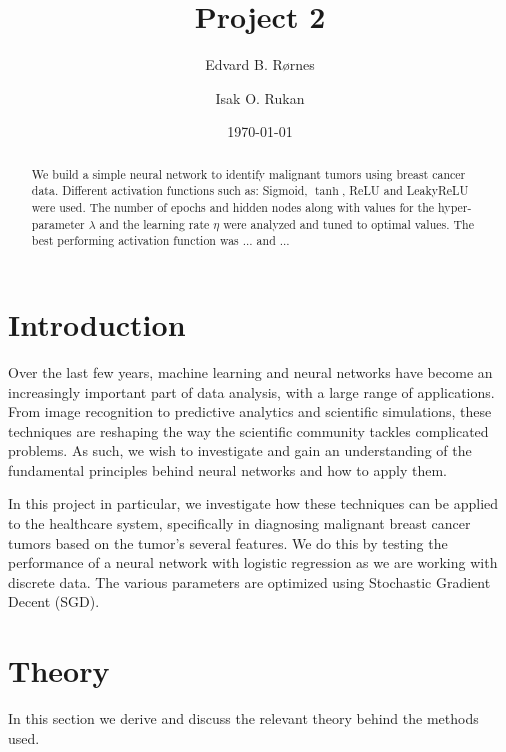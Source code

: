 \documentclass[%
reprint,
amsmath,amssymb,
aps,
]{revtex4-2}
\begin{document}
	
\title{Project 2}
\author{Edvard B. Rørnes}
\author{Isak O. Rukan}
\date{\today}

\begin{abstract}
	We build a simple neural network to identify malignant tumors using breast cancer data. Different activation functions such as: Sigmoid, $\tanh$, ReLU and LeakyReLU were used. The number of epochs and hidden nodes along with values for the hyper-parameter $\lambda$ and the learning rate $\eta$ were analyzed and tuned to optimal values. The best performing activation function was ... and ...
\end{abstract}

\maketitle

\section{Introduction}
Over the last few years, machine learning and neural networks have become an increasingly important part of data analysis, with a large range of applications. From image recognition to predictive analytics and scientific simulations, these techniques are reshaping the way the scientific community tackles complicated problems. As such, we wish to investigate and gain an understanding of the fundamental principles behind neural networks and how to apply them. 

In this project in particular, we investigate how these techniques can be applied to the healthcare system, specifically in diagnosing malignant breast cancer tumors based on the tumor's several features. We do this by testing the performance of a neural network with logistic regression as we are working with discrete data. The various parameters are optimized using Stochastic Gradient Decent (SGD).

\section{Theory}
In this section we derive and discuss the relevant theory behind the methods used. 
\end{document}
